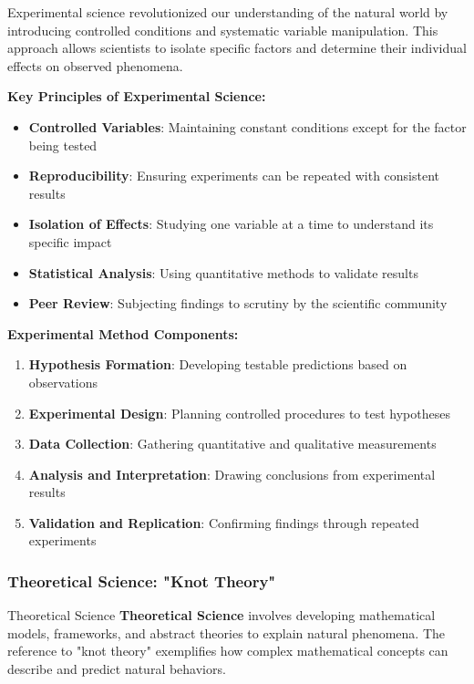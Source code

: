 Experimental science revolutionized our understanding of the natural world by introducing controlled conditions and systematic variable manipulation. This approach allows scientists to isolate specific factors and determine their individual effects on observed phenomena.

\textbf{Key Principles of Experimental Science:}
\begin{itemize}
    \item \textbf{Controlled Variables}: Maintaining constant conditions except for the factor being tested
    \item \textbf{Reproducibility}: Ensuring experiments can be repeated with consistent results
    \item \textbf{Isolation of Effects}: Studying one variable at a time to understand its specific impact
    \item \textbf{Statistical Analysis}: Using quantitative methods to validate results
    \item \textbf{Peer Review}: Subjecting findings to scrutiny by the scientific community
\end{itemize}

\textbf{Experimental Method Components:}
\begin{enumerate}
    \item \textbf{Hypothesis Formation}: Developing testable predictions based on observations
    \item \textbf{Experimental Design}: Planning controlled procedures to test hypotheses
    \item \textbf{Data Collection}: Gathering quantitative and qualitative measurements
    \item \textbf{Analysis and Interpretation}: Drawing conclusions from experimental results
    \item \textbf{Validation and Replication}: Confirming findings through repeated experiments
\end{enumerate}

\subsubsection{Theoretical Science: "Knot Theory"}

\begin{conceptcard}{Theoretical Science}
\textbf{Theoretical Science} involves developing mathematical models, frameworks, and abstract theories to explain natural phenomena. The reference to "knot theory" exemplifies how complex mathematical concepts can describe and predict natural behaviors.
\end{conceptcard}

